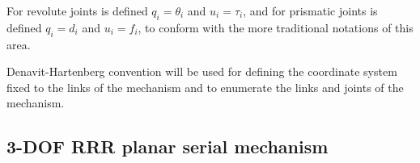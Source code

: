 \documentclass[a4paper,11pt,brazil,fleqn]{article}
\begin{document}
For revolute joints is defined $q_i = \theta_i$ and $u_i = \tau_i$, and for prismatic joints is defined $q_i = d_i$ and $u_i = f_i$, to conform with the more traditional notations of this area.

Denavit-Hartenberg convention will be used for defining the coordinate system fixed to the links of the mechanism and to enumerate the links and joints of the mechanism.

\subsection{3-DOF RRR planar serial mechanism}\label{S03-1}
\end{document}
